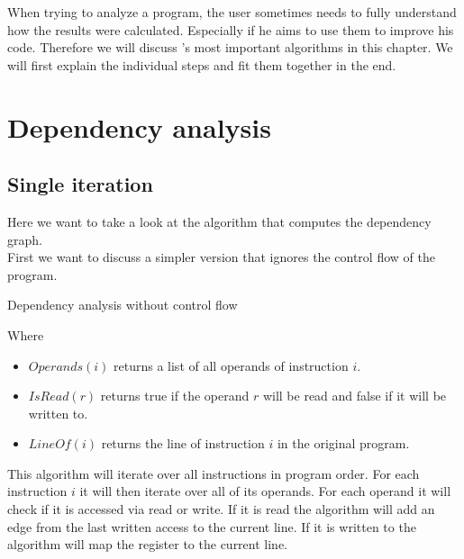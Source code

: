 When trying to analyze a program, the user sometimes needs to fully understand how the results were calculated. Especially if he aims to use them to improve his code. Therefore we will discuss \suaca's most important algorithms in this chapter. We will first explain the individual steps and fit them together in the end.

\section{Dependency analysis}
\label{sec:depanalysis}

\subsection{Single iteration}

Here we want to take a look at the algorithm that computes the dependency graph. \\
First we want to discuss a simpler version that ignores the control flow of the program.

\begin{algorithm}[H]
    \SetAlgoLined
    \caption{Dependency analysis without control flow}
    \label{alg:depsingle}
\end{algorithm}

\newpage

Where
\begin{itemize}
    \item $Operands(i)$ returns a list of all operands of instruction $i$.
    \item $IsRead(r)$ returns true if the operand $r$ will be read and false if it will be written to.
    \item $LineOf(i)$ returns the line of instruction $i$ in the original program.
\end{itemize}

This algorithm will iterate over all instructions in program order. For each instruction $i$ it will then iterate over all of its operands. For each operand it will check if it is accessed via read or write. If it is read the algorithm will add an edge from the last written access to the current line. If it is written to the algorithm will map the register to the current line.\\

